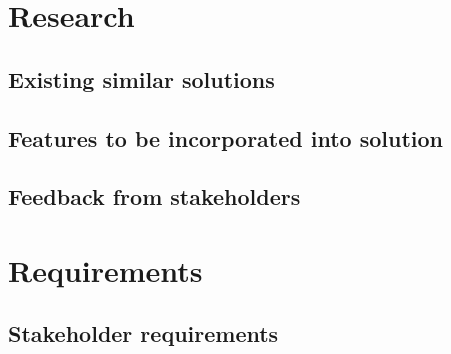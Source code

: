 \documentclass[11pt,a4paper]{report}
\begin{document}
\begin{comment}
half a page of key things that were found out from the interviews
should include / should not include / etc.


\end{comment}

\pagebreak

\section{Research}


\subsection{Existing similar solutions}


\pagebreak

\subsection{Features to be incorporated into solution}


\begin{comment}

\subsection{Limitations of the solution}
limitations:

- time

- limited by any software

- money - hosting backend?
- not getting an apple dev account
so won't be a "true" mobile app, more of a website on the home screen.
\end{comment}

\subsection{Feedback from stakeholders}

\section{Requirements}

\subsection{Stakeholder requirements}
\label{sec:stakeholderRequirements}

\end{document}

